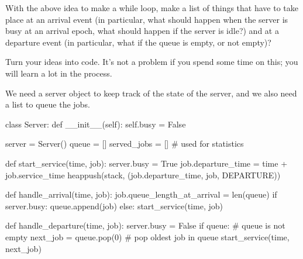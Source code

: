 \begin{exercise}
With the above idea to make a while loop, make a list of things that have to take place at an arrival event (in particular, what should happen when the server is busy at an arrival epoch, what should happen if the server is idle?)
and at a departure event (in particular, what if the queue is empty, or not empty)?


Turn your ideas into code.
It's not a problem if you spend some time on this; you will learn a lot in the process.
\begin{solution}
We need a server object to keep track of the state of the server, and we also need  a list to queue the jobs.

\begin{pyverbatim}
class Server:
    def __init__(self):
        self.busy = False


server = Server()
queue = []
served_jobs = []  # used for statistics


def start_service(time, job):
    server.busy = True
    job.departure_time = time + job.service_time
    heappush(stack, (job.departure_time, job, DEPARTURE))


def handle_arrival(time, job):
    job.queue_length_at_arrival = len(queue)
    if server.busy:
        queue.append(job)
    else:
        start_service(time, job)


def handle_departure(time, job):
    server.busy = False
    if queue:  # queue is not empty
        next_job = queue.pop(0)  # pop oldest job in queue
        start_service(time, next_job)
\end{pyverbatim}
\end{solution}
\end{exercise}


